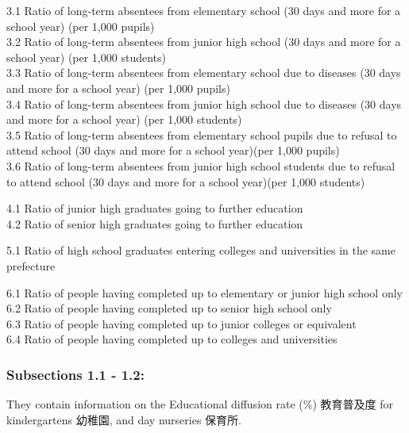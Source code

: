 \documentclass[
  12pt,
  letterpaper,
  DIV=11,
  numbers=noendperiod]{scrartcl}
\begin{document}
3.1 Ratio of long-term absentees from elementary school (30 days and
more for a school year) (per 1,000 pupils)\\
3.2 Ratio of long-term absentees from junior high school (30 days and
more for a school year) (per 1,000 students)\\
3.3 Ratio of long-term absentees from elementary school due to diseases
(30 days and more for a school year) (per 1,000 pupils)\\
3.4 Ratio of long-term absentees from junior high school due to diseases
(30 days and more for a school year) (per 1,000 students)\\
3.5 Ratio of long-term absentees from elementary school pupils due to
refusal to attend school (30 days and more for a school year)(per 1,000
pupils)\\
3.6 Ratio of long-term absentees from junior high school students due to
refusal to attend school (30 days and more for a school year)(per 1,000
students)

4.1 Ratio of junior high graduates going to further education\\
4.2 Ratio of senior high graduates going to further education

5.1 Ratio of high school graduates entering colleges and universities in
the same prefecture

6.1 Ratio of people having completed up to elementary or junior high
school only\\
6.2 Ratio of people having completed up to senior high school only\\
6.3 Ratio of people having completed up to junior colleges or
equivalent\\
6.4 Ratio of people having completed up to colleges and universities

\hypertarget{subsections-1.1---1.2-3}{%
\subsubsection{Subsections 1.1 - 1.2:}\label{subsections-1.1---1.2-3}}

They contain information on the Educational diffusion rate (\%)
教育普及度 for kindergartens 幼稚園, and day nurseries 保育所.
\end{document}
